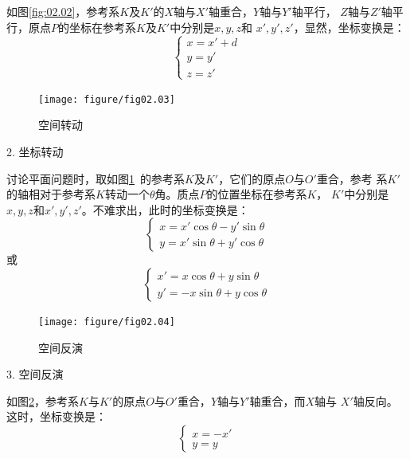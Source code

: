 \documentclass[../outline-of-mechanics.tex]{subfiles}
\begin{document}
如图\ref{fig:02.02}，参考系$K$及$K'$的$X$轴与$X'$轴重合，$Y$轴与$Y'$轴平行，
$Z$轴与$Z'$轴平行，原点$P$的坐标在参考系$K$及$K'$中分别是$x,y,z$和
$x',y',z'$，显然，坐标变换是：
\begin{equation}\label{eqn:02.02.03}
  \left\{\begin{array}{l}
    x=x'+d \\
    y=y'   \\
    z=z'
  \end{array}\right.
\end{equation}

\begin{figure}
  \centering
  \texttt{[image: figure/fig02.03]}
  \caption{空间转动}
  \label{fig:02.03}
\end{figure}
\textsf{2. 坐标转动}

讨论平面问题时，取如图\ref{fig:02.03}~的参考系$K$及$K'$，它们的原点$O$与$O'$重合，参考
系$K'$的轴相对于参考系$ K $转动一个$\theta$角。质点$P$的位置坐标在参考系$K$，
$K'$中分别是$x,y,z$和$x',y',z'$。不难求出，此时的坐标变换是：
\begin{equation}\label{eqn:02.02.04}
  \left\{\begin{array}{l}
    x=x'\cos\theta-y'\sin\theta \\
    y=x'\sin\theta+y'\cos\theta
  \end{array}\right.
\end{equation}
或
\begin{equation*}
  \left\{\begin{array}{l}
    x'=x\cos\theta+y\sin\theta \\
    y'=-x\sin\theta+y\cos\theta
  \end{array}\right.
\end{equation*}

\begin{figure}
  \centering
  \texttt{[image: figure/fig02.04]}
  \caption{空间反演}
  \label{fig:02.04}
\end{figure}
\textsf{3. 空间反演}

如图\ref{fig:02.04}，参考系$K$与$K'$的原点$O$与$O'$重合，$Y$轴与$Y'$轴重合，而$X$轴与
$X'$轴反向。这时，坐标变换是：
{\setlength{\mathindent}{2em}
\begin{equation}\label{eqn:02.02.05}
  \left\{\begin{array}{l}
    x=-x' \\
    y=y
  \end{array}\right.
\end{equation}}%
\end{document}
